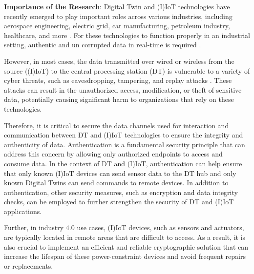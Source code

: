 \textbf{Importance of the Research}:
Digital Twin and (I)IoT technologies have recently emerged to play important roles across various industries, including aerospace engineering, electric grid, car manufacturing, petroleum industry, healthcare, and more \cite{tao_digital_2018}. For these technologies to function properly in an industrial setting, authentic and un corrupted data \cite{fuller_digital_2020} in real-time is required \cite{yuchenziqianzhangningtangApplicationDigitalTwin2022}. 

However, in most cases, the data transmitted over wired or wireless from the source ((I)IoT) to the central processing station (DT) is vulnerable to a variety of cyber threats, such as eavesdropping, tampering, and replay attacks \cite{hussainiTaxonomySecurityDefense2022}. These attacks can result in the unauthorized access, modification, or theft of sensitive data, potentially causing significant harm to organizations that rely on these technologies.

Therefore, it is critical to secure the data channels used for interaction and communication between DT  and (I)IoT technologies to ensure the integrity and authenticity of data. Authentication is a fundamental security principle that can address this concern by allowing only authorized endpoints to access and consume data. In the context of DT and (I)IoT, authentication can help ensure that only known (I)IoT devices can send sensor data to the DT hub and only known Digital Twins can send commands to remote devices. In addition to authentication, other security measures, such as encryption and data integrity checks, can be employed to further strengthen the security of DT and (I)IoT applications.

Further, in industry 4.0 use cases, (I)IoT devices, such as sensors and actuators, are typically located in remote areas that are difficult to access. As a result, it is also crucial to implement an efficient and reliable cryptographic solution that can increase the lifespan of these power-constraint devices and avoid frequent repairs or replacements.     


